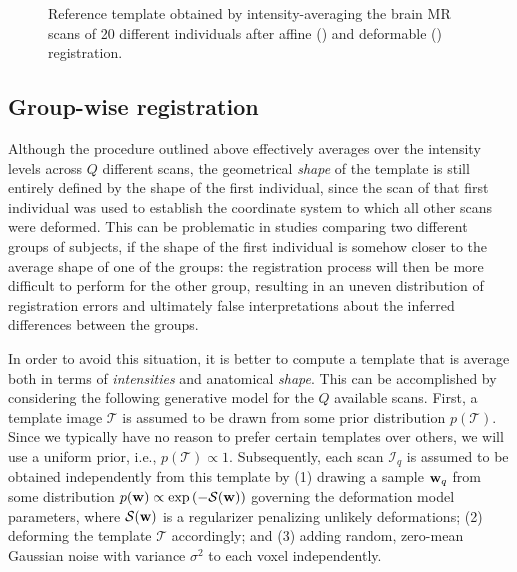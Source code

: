 \documentclass[10pt,twoside]{book}
\begin{document}
\begin{figure}
\begin{subfigure}{0.4\textwidth}
    \caption{}
    \label{fig:averageTemplate_b}
  \end{subfigure}
  \caption{Reference template obtained by intensity-averaging the brain MR scans of 20 different individuals after affine () and deformable () registration.}
  \label{fig:averageTemplate}
\end{figure}


\subsection{Group-wise registration}

Although the procedure outlined above effectively averages over the intensity levels across $Q$ different scans, the geometrical 
\emph{shape} of the template is still entirely defined by the shape of the first individual, since the scan of that first individual was used to establish the 
coordinate system to which all other scans were deformed. 
This can be problematic in 
studies comparing two different groups of subjects, if the shape of the first individual is somehow closer to the average shape of one of the groups:
the registration process will then be more difficult to perform for the other group, resulting in 
an uneven distribution of registration errors
and ultimately false 
interpretations about the inferred differences between the groups.


In order to avoid this situation, it is better to compute a template that is average both in terms of \emph{intensities} and anatomical \emph{shape}. This can be accomplished
by considering the following generative model for the $Q$ available scans. First, a template image $\mathcal{T}$ is assumed to be drawn from some prior distribution 
$p( \mathcal{T} )$. Since we typically have no reason to prefer certain templates over others, we will use a uniform prior, i.e., $p(\mathcal{T}) \propto 1$. 
Subsequently, each scan $\mathcal{I}_q$ is assumed to be obtained independently from this template by (1) drawing a sample $\mathbf{w}_q$ from 
some distribution $p(\mathbf{w} ) \propto \exp\left( -\mathcal{S}(\mathbf{w})\right)$ 
governing the deformation model parameters, where $\mathcal{S}(\mathbf{w})$ is 
a regularizer penalizing unlikely deformations; 
(2) deforming the template $\mathcal{T}$ accordingly; and (3) adding random, zero-mean Gaussian noise with 
variance $\sigma^2$ to each voxel independently. 
\end{document}
